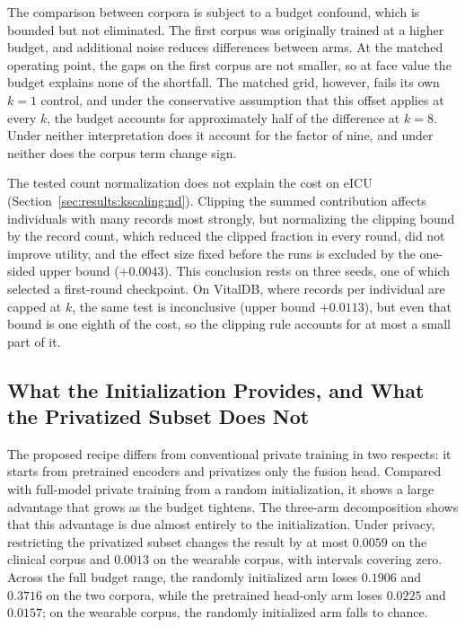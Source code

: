 The comparison between corpora is subject to a budget confound, which is
bounded but not eliminated. The first corpus was originally trained at a
higher budget, and additional noise reduces differences between arms. At the
matched operating point, the gaps on the first corpus are not smaller, so at
face value the budget explains none of the shortfall. The matched grid,
however, fails its own $k = 1$ control, and under the conservative assumption
that this offset applies at every $k$, the budget accounts for approximately
half of the difference at $k = 8$. Under neither interpretation does it account
for the factor of nine, and under neither does the corpus term change sign.

The tested count normalization does not explain the cost on eICU
(Section~\ref{sec:results:kscaling:nd}). Clipping the summed contribution
affects individuals with many records most strongly, but normalizing the
clipping bound by the record count, which reduced the clipped fraction in every
round, did not improve utility, and the effect size fixed before the runs is excluded by
the one-sided upper bound ($+0.0043$). This conclusion rests on three seeds, one
of which selected a first-round checkpoint. On VitalDB, where records per
individual are capped at $k$, the same test is inconclusive (upper bound
$+0.0113$), but even that bound is one eighth of the cost, so the clipping rule
accounts for at most a small part of it.

\subsection{What the Initialization Provides, and What the Privatized Subset Does
Not}
\label{sec:discussion:recipe}

The proposed recipe differs from conventional private training in two
respects: it starts from pretrained encoders and privatizes only the fusion
head. Compared with full-model private training from a random initialization,
it shows a large advantage that grows as the budget tightens. The three-arm
decomposition shows that this advantage is due almost entirely to the
initialization. Under privacy, restricting the privatized subset changes the
result by at most $0.0059$ on the clinical corpus and $0.0013$ on the wearable
corpus, with intervals covering zero. Across the full budget range, the
randomly initialized arm loses $0.1906$ and $0.3716$ on the two corpora, while
the pretrained head-only arm loses $0.0225$ and $0.0157$; on the wearable
corpus, the randomly initialized arm falls to chance.

